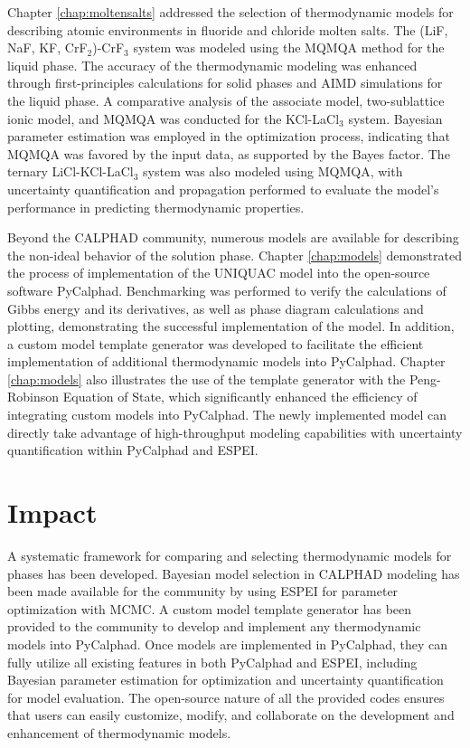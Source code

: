 Chapter \ref{chap:moltensalts} addressed the selection of thermodynamic models for describing atomic environments in fluoride and chloride molten salts. The (LiF, NaF, KF, CrF${_2}$)-CrF${_3}$ system was modeled using the MQMQA method for the liquid phase. The accuracy of the thermodynamic modeling was enhanced through first-principles calculations for solid phases and AIMD simulations for the liquid phase. A comparative analysis of the associate model, two-sublattice ionic model, and MQMQA was conducted for the KCl-LaCl${_3}$ system. Bayesian parameter estimation was employed in the optimization process, indicating that MQMQA was favored by the input data, as supported by the Bayes factor. The ternary LiCl-KCl-LaCl${_3}$ system was also modeled using MQMQA, with uncertainty quantification and propagation performed to evaluate the model's performance in predicting thermodynamic properties.

Beyond the CALPHAD community, numerous models are available for describing the non-ideal behavior of the solution phase.  Chapter \ref{chap:models} demonstrated the process of implementation of the UNIQUAC model into the open-source software PyCalphad. Benchmarking was performed to verify the calculations of Gibbs energy and its derivatives, as well as phase diagram calculations and plotting, demonstrating the successful implementation of the model. In addition, a custom model template generator was developed to facilitate the efficient implementation of additional thermodynamic models into PyCalphad. Chapter \ref{chap:models} also illustrates the use of the template generator with the Peng-Robinson Equation of State, which significantly enhanced the efficiency of integrating custom models into PyCalphad. The newly implemented model can directly take advantage of high-throughput modeling capabilities with uncertainty quantification within PyCalphad and ESPEI.

\section{Impact} \label{conclusion:sec:impact}
A systematic framework for comparing and selecting thermodynamic models for phases has been developed. Bayesian model selection in CALPHAD modeling has been made available for the community by using ESPEI for parameter optimization with MCMC. A custom model template generator has been provided to the community to develop and implement any thermodynamic models into PyCalphad. Once models are implemented in PyCalphad, they can fully utilize all existing features in both PyCalphad and ESPEI, including Bayesian parameter estimation for optimization and uncertainty quantification for model evaluation. The open-source nature of all the provided codes ensures that users can easily customize, modify, and collaborate on the development and enhancement of thermodynamic models.

